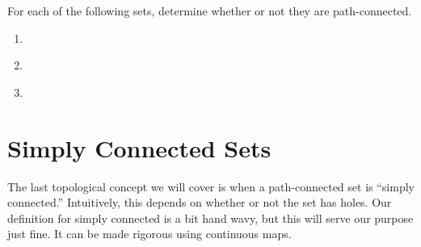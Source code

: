 \documentclass{ximera}
\begin{document}
\begin{problem}

For each of the following sets, determine whether or not they are path-connected.
\begin{enumerate}

\item \begin{image}\end{image}
\begin{multipleChoice}
\end{multipleChoice}

\item \begin{image}\end{image}
\begin{multipleChoice}
\end{multipleChoice}

\item \begin{image}\end{image}
\begin{multipleChoice}
\end{multipleChoice}

\end{enumerate}
\end{problem}

\section*{Simply Connected Sets}

The last topological concept we will cover is when a path-connected set is ``simply connected.'' Intuitively, this depends on whether or not the set has holes. Our definition for simply connected is a bit hand wavy, but this will serve our purpose just fine. It can be made rigorous using continuous maps. %
\end{document}
